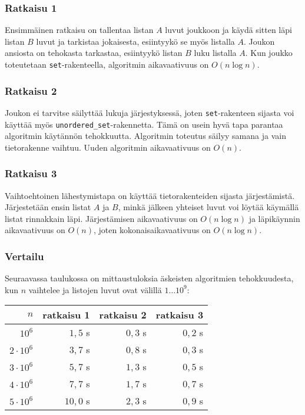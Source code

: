 \subsubsection{Ratkaisu 1}

Ensimmäinen ratkaisu on tallentaa listan $A$ luvut joukkoon
ja käydä sitten läpi listan $B$ luvut ja
tarkistaa jokaisesta, esiintyykö se myös listalla $A$.
Joukon ansiosta on tehokasta tarkastaa,
esiintyykö listan $B$ luku listalla $A$.
Kun joukko toteutetaan \texttt{set}-rakenteella,
algoritmin aikavaativuus on $O(n \log n)$.

\subsubsection{Ratkaisu 2}

Joukon ei tarvitse säilyttää lukuja
järjestyksessä, joten
\texttt{set}-ra\-ken\-teen sijasta voi
käyttää myös \texttt{unordered\_set}-ra\-ken\-net\-ta.
Tämä on usein hyvä tapa parantaa algoritmin
käytännön tehokkuutta.
Algoritmin toteutus säilyy samana ja vain tietorakenne vaihtuu.
Uuden algoritmin aikavaativuus on $O(n)$.

\subsubsection{Ratkaisu 3}

Vaihtoehtoinen lähestymistapa on käyttää tietorakenteiden
sijasta järjestämistä.
Järjestetään ensin listat $A$ ja $B$,
minkä jälkeen yhteiset luvut voi löytää
käymällä listat rinnakkain läpi.
Järjestämisen aikavaativuus on $O(n \log n)$ ja
läpikäynnin aikavaativuus on $O(n)$,
joten kokonaisaikavaativuus on $O(n \log n)$.

\subsubsection{Vertailu}

Seuraavassa taulukossa on mittaustuloksia
äskeisten algoritmien tehokkuudesta,
kun $n$ vaihtelee ja listojen luvut ovat välillä $1 \ldots 10^9$:

\begin{center}
\begin{tabular}{rrrr}
$n$ & ratkaisu 1 & ratkaisu 2 & ratkaisu 3 \\
\hline
$10^6$ & $1{,}5$ s & $0{,}3$ s & $0{,}2$ s \\
$2 \cdot 10^6$ & $3{,}7$ s & $0{,}8$ s & $0{,}3$ s \\
$3 \cdot 10^6$ & $5{,}7$ s & $1{,}3$ s & $0{,}5$ s \\
$4 \cdot 10^6$ & $7{,}7$ s & $1{,}7$ s & $0{,}7$ s \\
$5 \cdot 10^6$ & $10{,}0$ s & $2{,}3$ s & $0{,}9$ s \\
\end{tabular}
\end{center}

